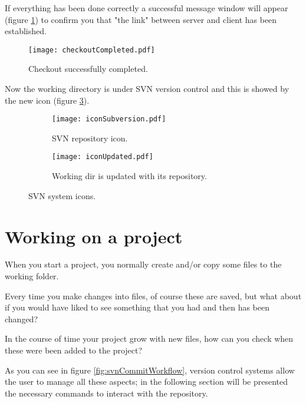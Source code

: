 If everything has been done correctly a successful message window will appear (figure \ref{fig:checkoutCompleted}) to confirm you that "the link" between server and client has been established.

\begin{figure}[htbp]
    \centering
    \texttt{[image: checkoutCompleted.pdf]}
    \caption{Checkout successfully completed.}
    \label{fig:checkoutCompleted}
\end{figure}

Now the working directory is under SVN version control and this is showed by the new icon (figure \ref{fig:iconWorkingUpdated}).

\begin{figure}[htpb]
\begin{subfigure}{0.45\textwidth}
  \centering
  \texttt{[image: iconSubversion.pdf]}
  \caption{SVN repository icon.}
  \label{fig:iconRepository}
\end{subfigure}%
\begin{subfigure}{0.45\textwidth}
  \centering
  \texttt{[image: iconUpdated.pdf]}
  \caption{Working dir is updated with its repository.}
  \label{fig:iconWorkingUpdated}
\end{subfigure}
\caption{SVN system icons.}
\label{fig:systemIcons_1}
\end{figure}


\newpage











\section{Working on a project}
\label{section:WorkOnProject}

When you start a project, you normally create and/or copy some files to the working folder.

Every time you make changes into files, of course these are saved, but what about if you would have liked to see something that you had and then has been changed?

In the course of time your project grow with new files, how can you check when these were been added to the project?

As you can see in figure \ref{fig:svnCommitWorkflow}, version control systems allow the user to manage all these aspects; in the following section will be presented the necessary commands to interact with the repository.



